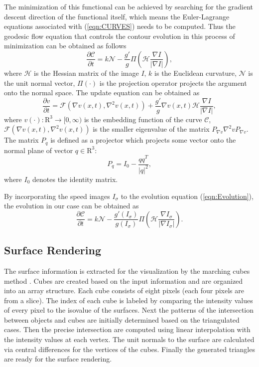 The minimization of this functional can be achieved by searching for the gradient descent direction of the functional itself, which means the Euler-Lagrange equations associated with (\ref{eqn:CURVES}) needs to be computed. %
Thus the geodesic flow equation that controls the contour evolution in this process of minimization can be obtained as follows
\begin{equation}
\label{eqn:Evolution}
\frac{\partial \mathcal{C}}{\partial t} = k \mathcal{N} - \frac{g'}{g} \varPi \left( \mathcal{H} \frac{\nabla I}{ \left| \nabla I \right| } \right),
\end{equation}
where $\mathcal{H}$ is the Hessian matrix of the image $I$, $k$ is the Euclidean curvature, $\mathcal{N}$ is the unit normal vector, $\varPi(\cdot)$ is the projection operator projects the argument onto the normal space. %
The update equation can be obtained as
\begin{equation}
\label{eqn:Update}
\frac{\partial v}{\partial t} = \mathcal{F} \left( \nabla v(x, t), \nabla^2 v(x, t) \right) + \frac{g'}{g} \nabla v(x, t) \mathcal{H} \frac{\nabla I}{ \left| \nabla I \right| },
\end{equation}
where $v(\cdot): \mathrm{R}^3 \rightarrow [0, \infty)$ is the embedding function of the curve $\mathcal{C}$, $\mathcal{F} \left( \nabla v(x, t), \nabla^2 v(x, t) \right)$ is the smaller eigenvalue of the matrix $P_{\nabla v} \nabla^2 v P_{\nabla v}$. %
The matrix $P_q$ is defined as a projector which projects some vector onto the normal plane of vector $q \in \mathrm{R}^3$:
\begin{equation}
\label{eqn:ProjectionOperator}
P_q = I_0 - \frac{qq^T}{\left| q \right|^2},
\end{equation}
where $I_0$ denotes the identity matrix.

By incorporating the speed images $I_{\sigma}$ to the evolution equation (\ref{eqn:Evolution}), the evolution in our case can be obtained as
\begin{equation}
\label{eqn:Application}
\frac{\partial \mathcal{C}}{\partial t} = k \mathcal{N} - \frac{g'(I_{\sigma})}{g(I_{\sigma})} \varPi \left( \mathcal{H} \frac{\nabla I_{\sigma}}{ \left| \nabla I_{\sigma} \right| } \right).%
\end{equation}

\subsection{Surface Rendering}

The surface information is extracted for the visualization by the marching cubes method \cite{Lorensen1987MC}.
Cubes are created based on the input information and are organized into an array structure.
Each cube consists of eight pixels (each four pixels are from a slice).
The index of each cube is labeled by comparing the intensity values of every pixel to the isovalue of the surfaces.
Next the patterns of the intersection between objects and cubes are initially determined based on the triangulated cases.
Then the precise intersection are computed using linear interpolation with the intensity values at each vertex.
The unit normals to the surface are calculated via central differences for the vertices of the cubes.
Finally the generated triangles are ready for the surface rendering. 